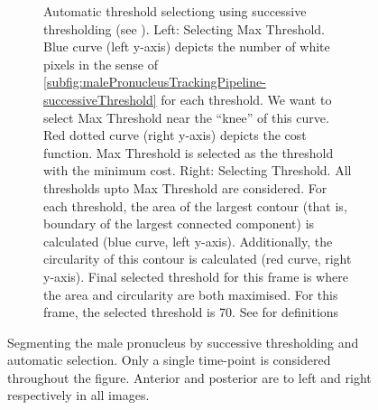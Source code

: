 \begin{figure}[h]
\begin{subfigure}{\textwidth}
    \caption{Automatic threshold selectiong using successive thresholding (see ). Left: Selecting Max Threshold. Blue curve (left y-axis) depicts the number of white pixels in the sense of \autoref{subfig:malePronucleusTrackingPipeline-successiveThreshold} for each threshold. We want to select Max Threshold near the \enquote{knee} of this curve. Red dotted curve (right y-axis) depicts the cost function. Max Threshold is selected as the threshold with the minimum cost. Right: Selecting Threshold. All thresholds upto Max Threshold are considered. For each threshold, the area of the largest contour (that is, boundary of the largest connected component) is calculated (blue curve, left y-axis). Additionally, the circularity of this contour is calculated (red curve, right y-axis). Final selected threshold for this frame is where the area and circularity are both maximised. For this frame, the selected threshold is \num{70}. See  for definitions} 
    \label{subfig:malePronucleusTrackingPipeline-thresholdSelection}
\end{subfigure}
\caption[Image analysis: Segmenting the male pronucleus]{Segmenting the male pronucleus by successive thresholding and automatic selection. Only a single time-point is considered throughout the figure. Anterior and posterior are to left and right respectively in all images.}
\label{fig:malePronucleusTrackingPipeline}
\end{figure}

